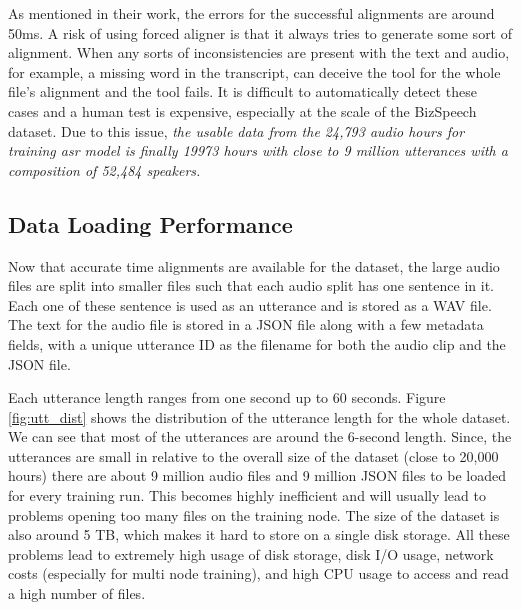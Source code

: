 As mentioned in their work, the errors for the successful alignments are around 50ms. A risk of using forced aligner is that it always tries to generate some sort of alignment. When any sorts of inconsistencies are present with the text and audio, for example, a missing word in the transcript, can deceive the tool for the whole file's alignment and the tool fails. It is difficult to automatically detect these cases and a human test is expensive, especially at the scale of the BizSpeech dataset. Due to this issue, \emph{the usable data from the 24,793 audio hours for training \acrshort{asr} model is finally 19973 hours with close to 9 million utterances with a composition of 52,484 speakers.}

\subsection{Data Loading Performance}
Now that accurate time alignments are available for the dataset, the large audio files are split into smaller files such that each audio split has one sentence in it. Each one of these sentence is used as an utterance and is stored as a WAV file. The text for the audio file is stored in a JSON file along with a few metadata fields, with a unique utterance ID as the filename for both the audio clip and the JSON file. 


Each utterance length ranges from one second up to 60 seconds. Figure \ref{fig:utt_dist} shows the distribution of the utterance length for the whole dataset. We can see that most of the utterances are around the 6-second length. Since, the utterances are small in relative to the overall size of the dataset (close to 20,000 hours) there are about 9 million audio files and 9 million JSON files to be loaded for every training run. This becomes highly inefficient and will usually lead to problems opening too many files on the training node. The size of the dataset is also around 5 TB, which makes it hard to store on a single disk storage. All these problems lead to extremely high usage of disk storage, disk I/O usage, network costs (especially for multi node training), and high CPU usage to access and read a high number of files. 


